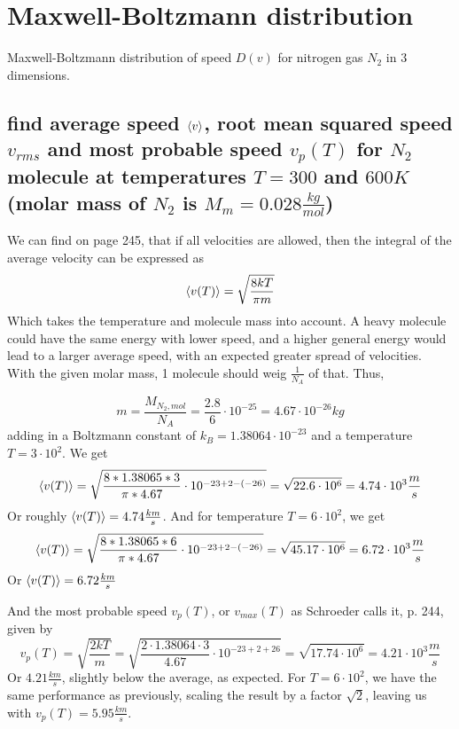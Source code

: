 \documentclass[a4paper,11pt]{article}
\begin{document}

\section{ Maxwell-Boltzmann distribution }
Maxwell-Boltzmann distribution of speed $D(v)$ for nitrogen gas $N_2$ in 3 dimensions.

\subsection{ find average speed  $\expval{v}$, root mean squared speed $v_{rms}$ and most probable speed $v_p(T)$ for $N_2$
            molecule at temperatures $T = 300$ and $600 K$ (molar mass of $N_2$ is $M_m = 0.028 \frac{kg}{mol}$) }%

We can find on page 245, that if all velocities are allowed, then the integral of the average velocity can be expressed as
\[ \ev{v(T)} = \sqrt{ \frac{ 8kT }{ \pi m } } \]
Which takes the temperature and molecule mass into account. A heavy molecule could have the same energy with lower speed, and
a higher general energy would lead to a larger average speed, with an expected greater spread of velocities. With the given molar 
mass, 1 molecule should weig $\frac{1}{N_A}$ of that. Thus, 

\[ m = \frac{ M_{N_2, mol} }{ N_A } = \frac{ 2.8 }{ 6 } \cdot 10^{-25} = 4.67\cdot 10^{-26} kg \]
adding in a Boltzmann constant of $k_B = 1.38064\cdot 10^{-23}$ and a temperature $T = 3\cdot 10^{2}$. We get
\[ \ev{v(T)} = \sqrt{ \frac{ 8 * 1.38065 * 3 }{ \pi * 4.67 }\cdot 10^{-23+2-(-26)} } 
    = \sqrt{ 22.6 \cdot 10^6 } = 4.74 \cdot 10^3 \frac{m}{s} \]
Or roughly \underline{$\ev{v(T)} = 4.74\frac{km}{s}$}. And for temperature $T = 6\cdot 10^2$, we get 
\[ \ev{v(T)} = \sqrt{ \frac{ 8 * 1.38065 * 6 }{ \pi * 4.67 }\cdot 10^{-23+2-(-26)} } 
    = \sqrt{ 45.17\cdot 10^6 } = 6.72 \cdot 10^3 \frac{m}{s} \]
Or \underline{$\ev{v(T)} = 6.72 \frac{km}{s}$}

And the most probable speed $v_p(T)$, or $v_{max}(T)$ as Schroeder calls it, p. 244\cite{ThermalSchroeder}, given by
\[ v_p(T) = \sqrt{ \frac{ 2kT }{ m } } = \sqrt{ \frac{ 2\cdot 1.38064\cdot 3 }{ 4.67 } \cdot 10^{-23 + 2 + 26} } 
    = \sqrt{ 17.74 \cdot 10^{6} } = 4.21\cdot 10^3 \frac{m}{s}\]
Or \underline{$4.21\frac{km}{s}$}, slightly below the average, as expected. For $T = 6\cdot 10^2$, we have the same performance
as previously, scaling the result by a factor $\sqrt{2}$, leaving us with \underline{$v_p(T) = 5.95 \frac{km}{s}$}.
\end{document}
